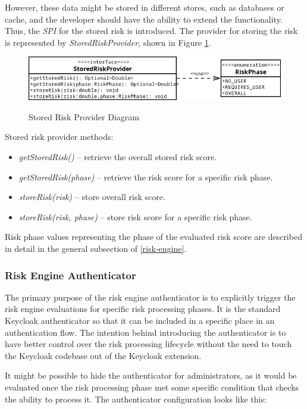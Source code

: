 However, these data might be stored in different stores, such as databases or cache, and the developer should have the ability to extend the functionality.
Thus, the \textit{SPI} for the stored risk is introduced.
The provider for storing the risk is represented by \textit{StoredRiskProvider}, shown in Figure \ref{fig:design-stored-risk-diagram}.

\begin{figure}[htbp]
  \centering
  \includegraphics[width=1\textwidth]{img/sections/5-design/stored-risk-provider.png}
  \label{fig:design-stored-risk-diagram}
  \caption{Stored Risk Provider Diagram}
\end{figure}

Stored risk provider methods:
\begin{itemize}
    \item \textit{getStoredRisk()} -- retrieve the overall stored risk score.
    \item \textit{getStoredRisk(phase)} -- retrieve the risk score for a specific risk phase.
    \item \textit{storeRisk(risk)} -- store overall risk score.
    \item \textit{storeRisk(risk, phase)} -- store risk score for a specific risk phase.
\end{itemize}

Risk phase values representing the phase of the evaluated risk score are described in detail in the general subsection of \ref{risk-engine}.

\newpage

\subsubsection{Risk Engine Authenticator}
The primary purpose of the risk engine authenticator is to explicitly trigger the risk engine evaluations for specific risk processing phases.
It is the standard Keycloak authenticator so that it can be included in a specific place in an authentication flow.
The intention behind introducing the authenticator is to have better control over the risk processing lifecycle without the need to touch the Keycloak codebase out of the Keycloak extension.

It might be possible to hide the authenticator for administrators, as it would be evaluated once the risk processing phase met some specific condition that checks the ability to process it.
\newline
\newline
The authenticator configuration looks like this:

